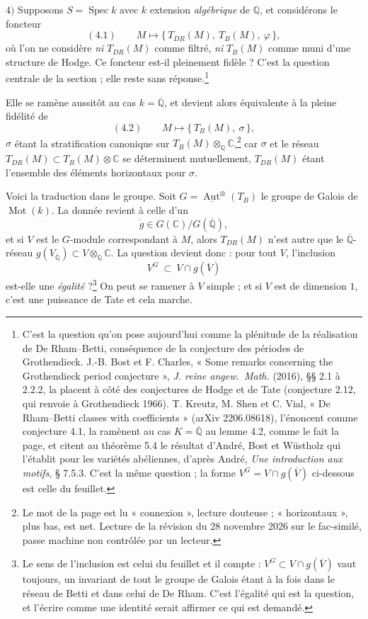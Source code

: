 \documentclass[11pt,a4paper]{article}
\begin{document}
$4)$ Supposons $S = \operatorname{Spec} k$ avec $k$ extension
\emph{algébrique} de $\mathbb{Q}$, et considérons le foncteur
\[
(4.1) \qquad M \longmapsto \{\, T_{DR}(M),\ T_{B}(M),\ \varphi \,\} ,
\]
où l'on ne considère \emph{ni} $T_{DR}(M)$ comme filtré, \emph{ni} $T_{B}(M)$
comme muni d'une structure de Hodge. Ce foncteur est-il pleinement fidèle ?
C'est la question centrale de la section ; elle reste sans réponse.\footnote{C'est
la question qu'on pose aujourd'hui comme la plénitude de la réalisation de
De Rham--Betti, conséquence de la conjecture des périodes de Grothendieck.
J.-B. Bost et F. Charles, « Some remarks concerning the Grothendieck period
conjecture », \emph{J. reine angew.\ Math.} (2016), §§ 2.1 à 2.2.2, la placent à
côté des conjectures de Hodge et de Tate (conjecture 2.12, qui renvoie à
Grothendieck 1966). T. Kreutz, M. Shen et C. Vial, « De Rham--Betti classes
with coefficients » (arXiv 2206.08618), l'énoncent comme conjecture 4.1, la
ramènent au cas $K = \overline{\mathbb{Q}}$ au lemme 4.2, comme le fait la page,
et citent au théorème 5.4 le résultat d'André, Bost et Wüstholz qui l'établit
pour les variétés abéliennes, d'après André, \emph{Une introduction aux motifs},
§ 7.5.3. C'est la même question ; la forme $V^{G} = V \cap g(\overline{V})$ ci-dessous
est celle du feuillet.}

Elle se ramène aussitôt au cas $k = \overline{\mathbb{Q}}$, et devient alors
équivalente à la pleine fidélité de
\[
(4.2) \qquad M \longmapsto \{\, T_{B}(M),\ \sigma \,\} ,
\]
$\sigma$ étant la stratification canonique sur
$T_{B}(M) \otimes_{\mathbb{Q}} \mathbb{C}$,\footnote{Le mot de la page est
lu « connexion », lecture douteuse ; « horizontaux », plus bas, est net.
Lecture de la révision du 28 novembre 2026 sur le fac-similé, passe machine
non contrôlée par un lecteur.} car $\sigma$ et le réseau
$T_{DR}(M) \subset T_{B}(M) \otimes \mathbb{C}$ se déterminent mutuellement,
$T_{DR}(M)$ étant l'ensemble des éléments horizontaux pour $\sigma$.

Voici la traduction dans le groupe. Soit
$G = \underline{\operatorname{Aut}}^{\otimes}(T_{B})$ le groupe de Galois de
$\operatorname{Mot}(k)$. La donnée revient à celle d'un
\[
\dot{g} \in G(\mathbb{C})/G(\overline{\mathbb{Q}}) ,
\]
et si $V$ est le $G$-module correspondant à $M$, alors $T_{DR}(M)$ n'est autre
que le $\overline{\mathbb{Q}}$-réseau $g(V_{\overline{\mathbb{Q}}}) \subset
V \otimes_{\mathbb{Q}} \mathbb{C}$. La question devient donc : pour
tout $V$, l'inclusion
\[
V^{G} \ \subset \ V \cap g(\overline{V})
\]
est-elle une \emph{égalité} ?\footnote{Le sens de l'inclusion est celui du
feuillet et il compte : $V^{G} \subset V \cap g(\overline{V})$ vaut toujours, un
invariant de tout le groupe de Galois étant à la fois dans le réseau de Betti et
dans celui de De Rham. C'est l'égalité qui est la question, et l'écrire comme une
identité serait affirmer ce qui est demandé.} On peut se ramener à $V$ simple ;
et si $V$ est de dimension $1$, c'est une puissance de Tate et cela marche.
\end{document}
